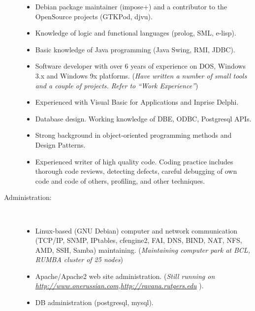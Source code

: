\documentclass[10pt,overlapped,line]{res}
\newcommand{\wdescription}[1]{({\small \textit{#1}})}
\begin{document}
\begin{resume}
\begin{description}
\begin{itemize}
       \item Debian package maintainer (impose+) and a contributor to
       the {O}pen{S}ource projects (GTKPod, djvu).

      \item Knowledge of logic and functional languages (prolog, SML, e-lisp).

      \item Basic knowledge of Java programming (Java Swing, RMI,
        JDBC).

      \item Software developer with over 6 years of experience on DOS,
        Windows 3.x and Windows 9x platforms.
        \wdescription{Have written a number of small tools and a couple of
          projects. Refer to ``Work Experience''}

      \item Experienced with Visual Basic for Applications and Inprise
        Delphi.

      \item Database design. Working knowledge of DBE, ODBC, Postgresql
        APIs.

      \item Strong background in object-oriented programming methods
        and Design Patterns.

      \item Experienced writer of high quality code. Coding practice
        includes thorough code reviews, detecting defects, careful
        debugging of own code and code of others, profiling, and other
        techniques.
      \end{itemize}

    \item[Administration:] \hspace*{\fill} \\
      \begin{itemize}
      \item Linux-based (GNU Debian) computer and network
        communication (TCP/IP, SNMP, IPtables, cfengine2, FAI, DNS, BIND,
        NAT, NFS, AMD, SSH, Samba) maintaining.
        \wdescription{Maintaining computer park at {BCL}, {RUMBA}
          cluster of 25 nodes}
      \item Apache/Apache2 web site administration.
        \wdescription{Still running on
          \href{URL}{http://www.onerussian.com},\href{URL}{http://ravana.rutgers.edu} }.
      \item DB administration (postgresql, mysql).
      \end{itemize}


\end{description}
\end{resume}
\end{document}
